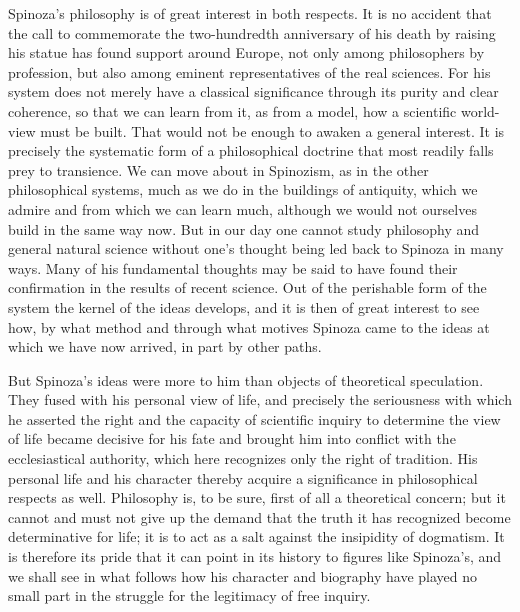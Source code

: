 \documentclass[12pt]{book}
\newcommand{\opage}[1]{\marginnote{\footnotesize\textit{[#1]}}}
\begin{document}
Spinoza's philosophy is of great interest in both respects. It is no accident that
the call \opage{3}to commemorate the two-hundredth anniversary of his death by raising
his statue has found support around Europe, not only among philosophers by
profession, but also among eminent representatives of the real sciences. For his
system does not merely have a classical significance through its purity and clear
coherence, so that we can learn from it, as from a model, how a scientific
world-view must be built. That would not be enough to awaken a general interest.
It is precisely the systematic form of a philosophical doctrine that most readily
falls prey to transience. We can move about in Spinozism, as in the other
philosophical systems, much as we do in the buildings of antiquity, which we admire
and from which we can learn much, although we would not ourselves build in the same
way now. But in our day one cannot study philosophy and general natural science
without one's thought being led back to Spinoza in many ways. Many of his
fundamental thoughts may be said to have found their confirmation in the results of
recent science. Out of the perishable form of the system the kernel of the ideas
develops, and it is then of great interest to see how, by what method and through
what motives Spinoza came to the ideas at which we have now arrived, in part by
other paths.

But Spinoza's ideas were more to him than objects of theoretical speculation. They
fused with his personal view of life, and precisely the seriousness with which he
asserted the right and the capacity of scientific inquiry to determine the view of
life became decisive for his fate and brought him into conflict with the
ecclesiastical \opage{4}authority, which here recognizes only the right of tradition.
His personal life and his character thereby acquire a significance in philosophical
respects as well. Philosophy is, to be sure, first of all a theoretical concern; but
it cannot and must not give up the demand that the truth it has recognized become
determinative for life; it is to act as a salt against the insipidity of dogmatism.
It is therefore its pride that it can point in its history to figures like
Spinoza's, and we shall see in what follows how his character and biography have
played no small part in the struggle for the legitimacy of free inquiry.
\end{document}
